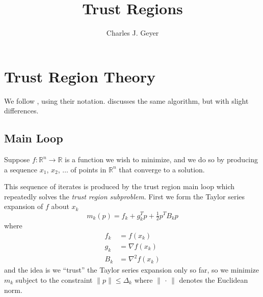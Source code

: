 \documentclass[11pt]{article}
\newcommand{\real}{\mathbb{R}}
\begin{document}
\title{Trust Regions}
\author{Charles J. Geyer}
\maketitle

\section{Trust Region Theory}

We follow \citet[Chapter~4]{naw}, using their notation.
\citet[Section~5.1]{flet} discusses the same algorithm,
but with slight differences.

\subsection{Main Loop}

Suppose $f : \real^n \to \real$ is a function we wish to minimize,
and we do so by producing a sequence $x_1$, $x_2$, $\ldots$ of points
in $\real^n$ that converge to a solution.

This sequence of iterates is produced by the trust region main loop
which repeatedly solves the \emph{trust region subproblem}.  First we form the
Taylor series expansion of $f$ about $x_k$
$$
   m_k(p) = f_k + g_k^T p + \tfrac{1}{2} p^T B_k p
$$
where
\begin{align*}
   f_k & = f(x_k)
   \\
   g_k & = \nabla f(x_k)
   \\
   B_k & = \nabla^2 f(x_k)
\end{align*}
and the idea is we ``trust'' the Taylor series expansion only so far,
so we minimize $m_k$ subject to the constraint $\lVert p \rVert \le \Delta_k$
where $\lVert \,\cdot\, \rVert$ denotes the Euclidean norm.
\end{document}

